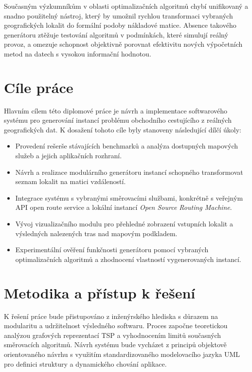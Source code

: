 Současným výzkumníkům v oblasti optimalizačních algoritmů chybí unifikovaný a snadno použitelný nástroj, který by umožnil rychlou transformaci vybraných geografických lokalit do formální podoby nákladové matice. Absence takového generátoru ztěžuje testování algoritmů v podmínkách, které simulují reálný provoz, a omezuje schopnost objektivně porovnat efektivitu nových výpočetních metod na datech s vysokou informační hodnotou.

\section{Cíle práce}
Hlavním cílem této diplomové práce je návrh a implementace softwarového systému pro generování instancí problému obchodního cestujícího z reálných geografických dat. K dosažení tohoto cíle byly stanoveny následující dílčí úkoly:

\begin{itemize}
    \item Provedení rešerše stávajících benchmarků a analýza dostupných mapových služeb a jejich aplikačních rozhraní.
    \item Návrh a realizace modulárního generátoru instancí schopného transformovat seznam lokalit na matici vzdáleností.
    \item Integrace systému s vybranými směrovacími službami, konkrétně s veřejným API open route service a lokální instancí \textit{Open Source Routing Machine}.
    \item Vývoj vizualizačního modulu pro přehledné zobrazení vstupních lokalit a výsledných nalezených tras nad mapovým podkladem.
    \item Experimentální ověření funkčnosti generátoru pomocí vybraných optimalizačních algoritmů a zhodnocení vlastností vygenerovaných instancí.
\end{itemize}

\section{Metodika a přístup k řešení}

K řešení práce bude přistupováno z inženýrského hlediska s důrazem na modularitu a udržitelnost výsledného softwaru. Proces započne teoretickou analýzou grafových reprezentací TSP a vyhodnocením limitů současných směrovacích algoritmů. Návrh systému bude vycházet z principů objektově orientovaného návrhu s využitím standardizovaného modelovacího jazyka UML pro definici struktury a dynamického chování aplikace.

